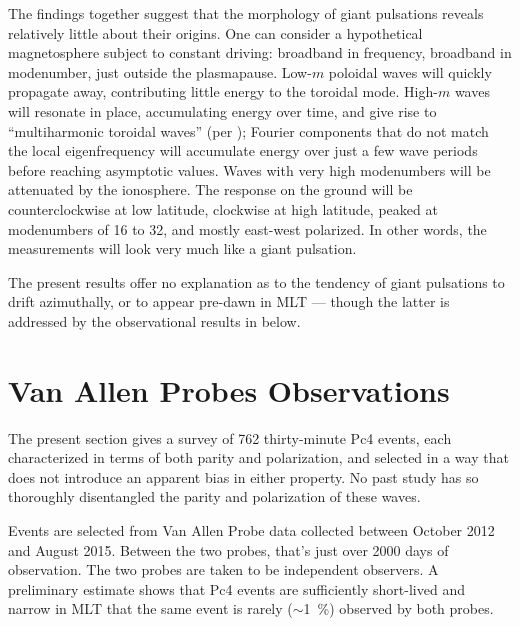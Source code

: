 \documentclass{article}
\newcommand{\about}{\ensuremath{\sim}}
\newcommand{\todo}[1]{ \textcolor{red}{TODO: #1} }
\newcommand{\azm}{\ensuremath{m}\xspace}
\begin{document}
The findings together suggest that the morphology of giant pulsations reveals relatively little about their origins. One can consider a hypothetical magnetosphere subject to constant driving: broadband in frequency, broadband in modenumber, just outside the plasmapause. Low-\azm poloidal waves will quickly propagate away, contributing little energy to the toroidal mode. High-\azm waves will resonate in place, accumulating energy over time, and give rise to ``multiharmonic toroidal waves'' (per \cite{takahashi_2011}); Fourier components that do not match the local eigenfrequency will accumulate energy over just a few wave periods before reaching asymptotic values. Waves with very high modenumbers will be attenuated by the ionosphere. The response on the ground will be counterclockwise at low latitude, clockwise at high latitude, peaked at modenumbers of 16 to 32, and mostly east-west polarized. In other words, the measurements will look very much like a giant pulsation.

The present results offer no explanation as to the tendency of giant pulsations to drift azimuthally, or to appear pre-dawn in MLT --- though the latter is addressed by the observational results in below.


\section{Van Allen Probes Observations}

The present section gives a survey of 762 thirty-minute Pc4 events, each characterized in terms of both parity and polarization, and selected in a way that does not introduce an apparent bias in either property. No past study has so thoroughly disentangled the parity and polarization of these waves.

Events are selected from Van Allen Probe data collected between October 2012 and August 2015. Between the two probes, that's just over 2000 days of observation. The two probes are taken to be independent observers. A preliminary estimate shows that Pc4 events are sufficiently short-lived and narrow in MLT that the same event is rarely (\about\SI{1}{\percent}) observed by both probes.

\end{document}
